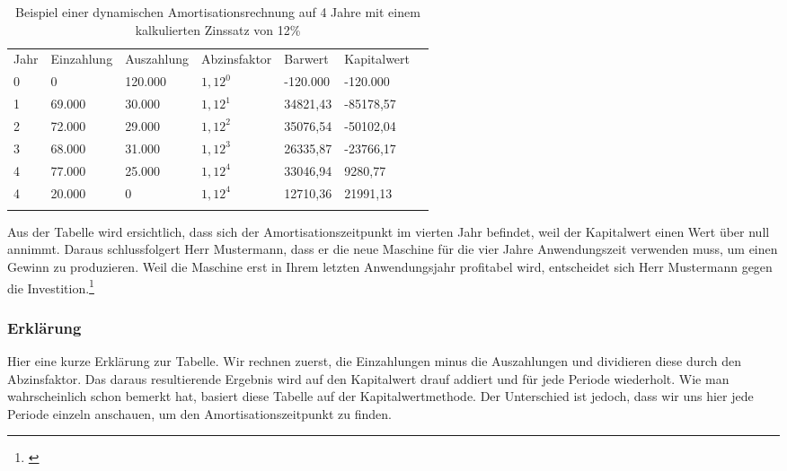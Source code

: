 \begin{table}[!h]
    \begin{tabular}{lllllll}
        \cline{1-6} \rowcolor{gray}
        Jahr & Einzahlung & Auszahlung & Abzinsfaktor & Barwert  & Kapitalwert \\ \cline{1-6} \rowcolor{white}
        0    & 0          & 120.000    & $1,12^0$     & -120.000 & -120.000    \\ \cline{1-6} \rowcolor{white}
        1    & 69.000     & 30.000     & $1,12^1$     & 34821,43 & -85178,57   \\ \cline{1-6} \rowcolor{white}
        2    & 72.000     & 29.000     & $1,12^2$     & 35076,54 & -50102,04   \\ \cline{1-6} \rowcolor{white}
        3    & 68.000     & 31.000     & $1,12^3$     & 26335,87 & -23766,17   \\ \cline{1-6} \rowcolor{white}
        4    & 77.000     & 25.000     & $1,12^4$     & 33046,94 & 9280,77     \\ \cline{1-6} \rowcolor{white}
        4    & 20.000     & 0          & $1,12^4$     & 12710,36 & 21991,13    \\ \cline{1-6} \rowcolor{white}
    \end{tabular}
    \caption{Beispiel einer dynamischen Amortisationsrechnung auf 4 Jahre mit einem kalkulierten Zinssatz von 12\%}\label{tb:dynamische Amortisationsrechnung}
\end{table}
\bigskip
\noindent
Aus der Tabelle wird ersichtlich, dass sich der Amortisationszeitpunkt im vierten Jahr befindet, weil der Kapitalwert einen Wert über null annimmt. Daraus schlussfolgert Herr Mustermann, dass er die neue Maschine für die vier Jahre Anwendungszeit verwenden muss, um einen Gewinn zu produzieren. Weil die Maschine erst in Ihrem letzten Anwendungsjahr profitabel wird, entscheidet sich Herr Mustermann gegen die Investition.\footnote{\cite{payoff}}
\subsubsection{Erklärung}
Hier eine kurze Erklärung zur Tabelle. Wir rechnen zuerst, die Einzahlungen minus die Auszahlungen und dividieren diese durch den Abzinsfaktor. Das daraus resultierende Ergebnis wird auf den Kapitalwert drauf addiert und für jede Periode wiederholt. Wie man wahrscheinlich schon bemerkt hat, basiert diese Tabelle auf der Kapitalwertmethode. Der Unterschied ist jedoch, dass wir uns hier jede Periode einzeln anschauen, um den Amortisationszeitpunkt zu finden.
